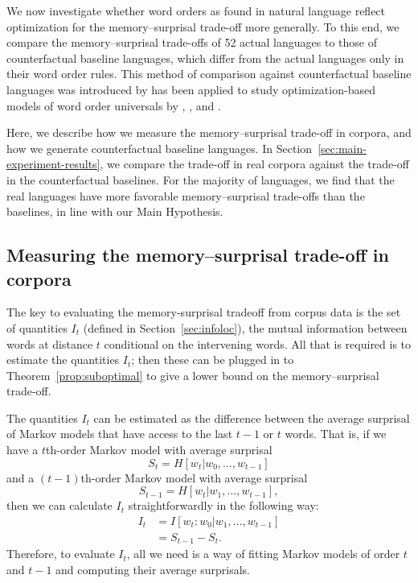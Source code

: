 We now investigate whether word orders as found in natural language reflect optimization for the memory--surprisal trade-off more generally.
To this end, we compare the memory--surprisal trade-offs of 52 actual languages to those of counterfactual baseline languages, which differ from the actual languages only in their word order rules. This method of comparison against counterfactual baseline languages was introduced by \citet{gildea-optimizing-2007,gildea-grammars-2010} has been applied to study optimization-based models of word order universals by \citet{futrell-large-scale-2015}, \citet{gildea-human-2015}, and \citet{hahn2020universals}.

Here, we describe how we measure the memory--surprisal trade-off in corpora, and how we generate counterfactual baseline languages. In Section~\ref{sec:main-experiment-results}, we compare the trade-off in real corpora against the trade-off in the counterfactual baselines. For the majority of languages, we find that the real languages have more favorable memory--surprisal trade-offs than the baselines, in line with our Main Hypothesis.

\subsection{Measuring the memory--surprisal trade-off in corpora}

The key to evaluating the memory-surprisal tradeoff from corpus data is the set of quantities $I_t$ (defined in Section~\ref{sec:infoloc}), the  mutual information between words at distance $t$ conditional on the intervening words. 
All that is required is to estimate the quantities $I_t$; then these can be plugged in to Theorem~\ref{prop:suboptimal} to give a lower bound on the memory--surprisal trade-off. 

The quantities $I_t$ can be estimated as the difference between the average surprisal of Markov models that have access to the last $t-1$ or $t$ words.
That is, if we have a $t$th-order Markov model with average surprisal
\begin{equation*}
    S_t = H[w_t | w_0, \dots, w_{t-1}]
\end{equation*}
and a $(t-1)$th-order Markov model with average surprisal
\begin{equation*}
    S_{t-1} = H[w_t | w_1, \dots, w_{t-1}],
\end{equation*}
then we can calculate $I_t$ straightforwardly in the following way:
\begin{align}
    \nonumber
    I_t &= I[w_t : w_0 | w_1, \dots, w_{t-1}] \\
    \nonumber
    &= S_{t-1} - S_t.
\end{align}
Therefore, to evaluate $I_t$, all we need is a way of fitting Markov models of order $t$ and $t-1$ and computing their average surprisals.

